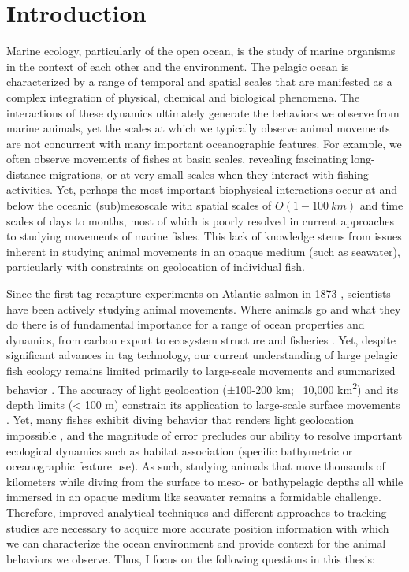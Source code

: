 
\chapter{Introduction}
\raggedbottom
\clearpage


Marine ecology, particularly of the open ocean, is the study of marine organisms in the context of each other and the environment. The pelagic ocean is characterized by a range of temporal and spatial scales that are manifested as a complex integration of physical, chemical and biological phenomena. The interactions of these dynamics ultimately generate the behaviors we observe from marine animals, yet the scales at which we typically observe animal movements are not concurrent with many important oceanographic features. For example, we often observe movements of fishes at basin scales, revealing fascinating long-distance migrations, or at very small scales when they interact with fishing activities. Yet, perhaps the most important biophysical interactions occur at and below the oceanic (sub)mesoscale with spatial scales of $O(1 - 100\ km)$ and time scales of days to months, most of which is poorly resolved in current approaches to studying movements of marine fishes. This lack of knowledge stems from issues inherent in studying animal movements in an opaque medium (such as seawater), particularly with constraints on geolocation of individual fish. 

Since the first tag-recapture experiments on Atlantic salmon in 1873 \citep{Everhart1975}, scientists have been actively studying animal movements. Where animals go and what they do there is of fundamental importance for a range of ocean properties and dynamics, from carbon export \citep[\eg][]{Lavery2010a} to ecosystem structure \citep[\eg][]{Thorrold2014} and fisheries \citep[\eg][]{Block2005}. Yet, despite significant advances in tag technology, our current understanding of large pelagic fish ecology remains limited primarily to large-scale movements and summarized behavior \citep{Braun2015}. The accuracy of light geolocation ($\pm$100-200 km; ~10,000 km\textsuperscript{2}) and its depth limits (< 100 m) constrain its application to large-scale surface movements \citep{Braun2015a}. Yet, many fishes exhibit diving behavior that renders light geolocation impossible \citep{Dewar2011}, and the magnitude of error precludes our ability to resolve important ecological dynamics such as habitat association (\eg specific bathymetric or oceanographic feature use). As such, studying animals that move thousands of kilometers while diving from the surface to meso- or bathypelagic depths all while immersed in an opaque medium like seawater remains a formidable challenge. Therefore, improved analytical techniques and different approaches to tracking studies are necessary to acquire more accurate position information with which we can characterize the ocean environment and provide context for the animal behaviors we observe. Thus, I focus on the following questions in this thesis:

